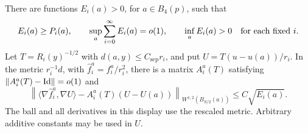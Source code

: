 \begin{lemma}
\label{pi:radial-invariance}
There are functions $E_i(a)>0$, for $a\in B_4(p)$, such that
\begin{equation}
 E_i(a)\ge P_i(a),\qquad
 \sup_a\sum_{i=0}^\infty E_i(a)=o(1),\qquad
 \inf_a E_i(a)>0\quad\hbox{for each fixed }i.
 \label{pi:pinching-summability}
\end{equation}
Let $T=R_i(y)^{-1/2}$ with $d(a,y)\le C_{\mathrm{sep}}r_i$, and put
$U=T(u-u(a))/r_i$.  In the metric $r_i^{-1}d$, with
$\widehat f_i^a=f_i^a/r_i^2$, there is a matrix $A_i^a(T)$
satisfying $\|A_i^a(T)-\mathrm{Id}\|=o(1)$ and
\begin{equation}
 \left\|\langle\nabla\widehat f_i^a,\nabla U\rangle
       -A_i^a(T)(U-U(a))\right\|_{W^{1,2}(B_{S/2}(a))}
 \le C\sqrt{E_i(a)}.
 \label{pi:radial-invariance-equation}
\end{equation}
The ball and all derivatives in this display use the rescaled
metric.  Arbitrary additive constants may be used in $U$.
\end{lemma}

